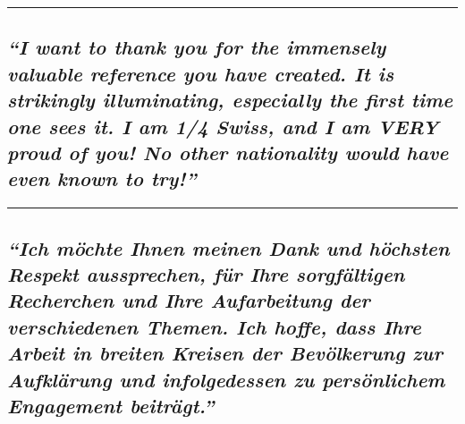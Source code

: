 \begin{center}\rule{0.5\linewidth}{\linethickness}\end{center}

\hypertarget{i-want-to-thank-you-for-the-immensely-valuable-reference-you-have-created-it-is-strikingly-illuminating-especially-the-first-time-one-sees-it-i-am-14-swiss-and-i-am-very-proud-of-you-no-other-nationality-would-have-even-known-to-try}{%
\subsection{\texorpdfstring{\emph{``I want to thank you for the
immensely valuable reference you have created. It is strikingly
illuminating, especially the first time one sees it. I am 1/4 Swiss, and
I am VERY proud of you! No other nationality would have even known to
try!''}}{``I want to thank you for the immensely valuable reference you have created. It is strikingly illuminating, especially the first time one sees it. I am 1/4 Swiss, and I am VERY proud of you! No other nationality would have even known to try!''}}\label{i-want-to-thank-you-for-the-immensely-valuable-reference-you-have-created-it-is-strikingly-illuminating-especially-the-first-time-one-sees-it-i-am-14-swiss-and-i-am-very-proud-of-you-no-other-nationality-would-have-even-known-to-try}}

\begin{center}\rule{0.5\linewidth}{\linethickness}\end{center}

\hypertarget{ich-muxf6chte-ihnen-meinen-dank-und-huxf6chsten-respekt-aussprechen-fuxfcr-ihre-sorgfuxe4ltigen-recherchen-und-ihre-aufarbeitung-der-verschiedenen-themen-ich-hoffe-dass-ihre-arbeit-in-breiten-kreisen-der-bevuxf6lkerung-zur-aufkluxe4rung-und-infolgedessen-zu-persuxf6nlichem-engagement-beitruxe4gt}{%
\subsection{\texorpdfstring{\emph{``Ich möchte Ihnen meinen Dank und
höchsten Respekt aussprechen, für Ihre sorgfältigen Recherchen und Ihre
Aufarbeitung der verschiedenen Themen. Ich hoffe, dass Ihre Arbeit in
breiten Kreisen der Bevölkerung zur Aufklärung und infolgedessen zu
persönlichem Engagement
beiträgt.''}}{``Ich möchte Ihnen meinen Dank und höchsten Respekt aussprechen, für Ihre sorgfältigen Recherchen und Ihre Aufarbeitung der verschiedenen Themen. Ich hoffe, dass Ihre Arbeit in breiten Kreisen der Bevölkerung zur Aufklärung und infolgedessen zu persönlichem Engagement beiträgt.''}}\label{ich-muxf6chte-ihnen-meinen-dank-und-huxf6chsten-respekt-aussprechen-fuxfcr-ihre-sorgfuxe4ltigen-recherchen-und-ihre-aufarbeitung-der-verschiedenen-themen-ich-hoffe-dass-ihre-arbeit-in-breiten-kreisen-der-bevuxf6lkerung-zur-aufkluxe4rung-und-infolgedessen-zu-persuxf6nlichem-engagement-beitruxe4gt}}

